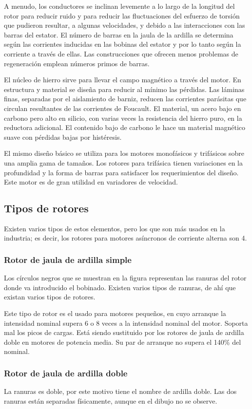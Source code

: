 \documentclass[a4paper,11pt]{article}
\begin{document}
A menudo, los conductores se inclinan levemente a lo largo de la longitud del rotor para reducir ruido y para reducir las fluctuaciones del esfuerzo de torsión que pudieron resultar, a algunas velocidades, y debido a las interacciones con las barras del estator. El número de barras en la jaula de la ardilla se determina según las corrientes inducidas en las bobinas del estator y por lo tanto según la corriente a través de ellas. Las construcciones que ofrecen menos problemas de regeneración emplean números primos de barras.

El núcleo de hierro sirve para llevar el campo magnético a través del motor. En estructura y material se diseña para reducir al mínimo las pérdidas. Las láminas finas, separadas por el aislamiento de barniz, reducen las corrientes parásitas que circulan resultantes de las corrientes de Foucault. El material, un acero bajo en carbono pero alto en silicio, con varias veces la resistencia del hierro puro, en la reductora adicional. El contenido bajo de carbono le hace un material magnético suave con pérdidas bajas por histéresis.

El mismo diseño básico se utiliza para los motores monofásicos y trifásicos sobre una amplia gama de tamaños. Los rotores para trifásica tienen variaciones en la profundidad y la forma de barras para satisfacer los requerimientos del diseño. Este motor es de gran utilidad en variadores de velocidad.
\subsection{Tipos de rotores}
Existen varios tipos de estos elementos, pero los que son más usados en la industria; es decir, los rotores para motores asíncronos de corriente alterna son 4.
\subsubsection{Rotor de jaula de ardilla simple}
Los círculos negros que se muestran en la figura representan las ranuras del rotor donde va introducido el bobinado. Existen varios tipos de ranuras, de ahí que existan varios tipos de rotores.

Este tipo de rotor es el usado para motores pequeños, en cuyo arranque la intensidad nominal supera 6 o 8 veces a la intensidad nominal del motor. Soporta mal los picos de cargas. Está siendo sustituido por los rotores de jaula de ardilla doble en motores de potencia media. Su par de arranque no supera el 140\% del nominal. 
\subsubsection{Rotor de jaula de ardilla doble}
La ranuras es doble, por este motivo tiene el nombre de ardilla doble. Las dos ranuras están separadas físicamente, aunque en el dibujo no se observe.
\end{document}
